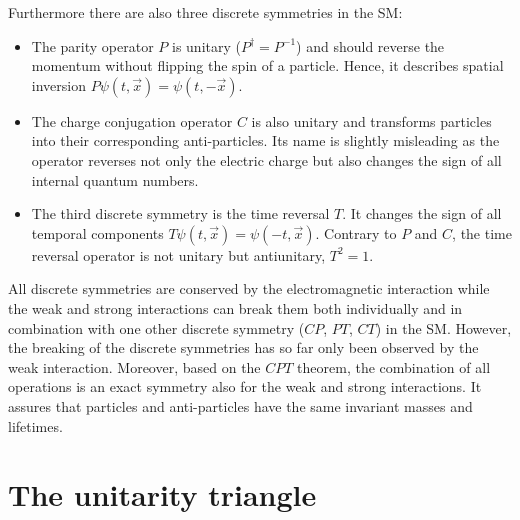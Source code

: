 Furthermore there are also three discrete symmetries in the \ac{SM}:
\begin{itemize}
	\item The parity operator $P$ is unitary ($P^{\dagger}=P^{-1}$) and should reverse the momentum without flipping the spin of a particle.
		Hence, it describes spatial inversion $P\psi\left(t,\vec{x}\right) = \psi\left(t,-\vec{x}\right)$.
	\item The charge conjugation operator $C$ is also unitary and transforms particles into their corresponding anti-particles.
		Its name is slightly misleading as the operator reverses not only the electric charge but also changes the sign of all internal quantum numbers.
	\item The third discrete symmetry is the time reversal $T$.
		It changes the sign of all temporal components $T\psi\left(t,\vec{x}\right) = \psi\left(-t,\vec{x}\right)$.
		Contrary to $P$ and $C$, the time reversal operator is not unitary but antiunitary, \ie $T^2=1$.
\end{itemize}
All discrete symmetries are conserved by the electromagnetic interaction while the weak and strong interactions can break them both
individually and in combination with one other discrete symmetry ($CP$, $PT$, $CT$) in the \ac{SM}.
However, the breaking of the discrete symmetries has so far only been observed by the weak interaction.
Moreover, based on the $CPT$ theorem, the combination of all operations is an exact symmetry also for the weak and strong interactions.
It assures that particles and anti-particles have the same invariant masses and lifetimes.

\section{The unitarity triangle}
\label{sec:unitarityTriangle}

